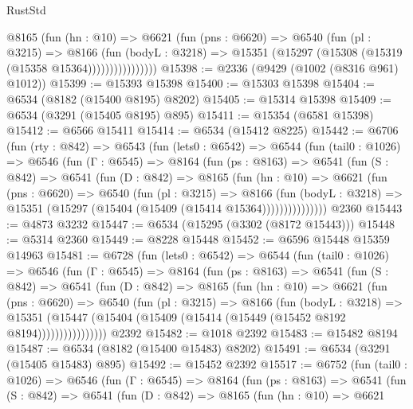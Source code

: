 \begin{lexlean}{RustStd}
\begin{coremodule}
                  @8165
                    (fun (hn : @10) =>
                    @6621
                      (fun (pns : @6620) =>
                      @6540
                        (fun (pl : @3215) =>
                        @8166
                          (fun (bodyL : @3218) =>
                          @15351 (@15297 (@15308 (@15319 (@15358 @15364))))))))))))))))
@15398 := @2336 (@9429 (@1002 (@8316 @961) @1012))
@15399 := @15393 @15398
@15400 := @15303 @15398
@15404 := @6534 (@8182 (@15400 @8195) @8202)
@15405 := @15314 @15398
@15409 := @6534 (@3291 (@15405 @8195) @895)
@15411 := @15354 (@6581 @15398)
@15412 := @6566 @15411
@15414 := @6534 (@15412 @8225)
@15442 := @6706
    (fun (rty : @842) =>
    @6543
      (fun (lets0 : @6542) =>
      @6544
        (fun (tail0 : @1026) =>
        @6546
          (fun (Γ : @6545) =>
          @8164
            (fun (ps : @8163) =>
            @6541
              (fun (S : @842) =>
              @6541
                (fun (D : @842) =>
                @8165
                  (fun (hn : @10) =>
                  @6621
                    (fun (pns : @6620) =>
                    @6540
                      (fun (pl : @3215) =>
                      @8166
                        (fun (bodyL : @3218) =>
                        @15351 (@15297 (@15404 (@15409 (@15414 @15364)))))))))))))))
    @2360
@15443 := @4873 @3232
@15447 := @6534 (@15295 (@3302 (@8172 @15443)))
@15448 := @5314 @2360
@15449 := @8228 @15448
@15452 := @6596 @15448 @15359 @14963
@15481 := @6728
    (fun (lets0 : @6542) =>
    @6544
      (fun (tail0 : @1026) =>
      @6546
        (fun (Γ : @6545) =>
        @8164
          (fun (ps : @8163) =>
          @6541
            (fun (S : @842) =>
            @6541
              (fun (D : @842) =>
              @8165
                (fun (hn : @10) =>
                @6621
                  (fun (pns : @6620) =>
                  @6540
                    (fun (pl : @3215) =>
                    @8166
                      (fun (bodyL : @3218) =>
                      @15351
                        (@15447 (@15404 (@15409 (@15414 (@15449 (@15452 @8192 @8194))))))))))))))))
    @2392
@15482 := @1018 @2392
@15483 := @15482 @8194
@15487 := @6534 (@8182 (@15400 @15483) @8202)
@15491 := @6534 (@3291 (@15405 @15483) @895)
@15492 := @15452 @2392
@15517 := @6752
    (fun (tail0 : @1026) =>
    @6546
      (fun (Γ : @6545) =>
      @8164
        (fun (ps : @8163) =>
        @6541
          (fun (S : @842) =>
          @6541
            (fun (D : @842) =>
            @8165
              (fun (hn : @10) =>
              @6621

\end{coremodule}
\end{lexlean}
